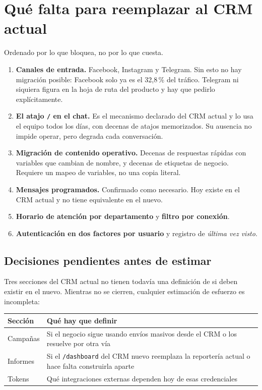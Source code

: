 \documentclass[11pt,a4paper]{article}
\newcommand{\cod}[1]{\texttt{\small #1}}
\begin{document}
\section{Qué falta para reemplazar al CRM actual}

Ordenado por lo que bloquea, no por lo que cuesta.

\begin{enumerate}
  \item \textbf{Canales de entrada.} Facebook, Instagram y Telegram. Sin esto no hay
        migración posible: Facebook solo ya es el 32,8\,\% del tráfico. Telegram ni
        siquiera figura en la hoja de ruta del producto y hay que pedirlo
        explícitamente.

  \item \textbf{El atajo \cod{/} en el chat.} Es el mecanismo declarado del CRM actual
        y lo usa el equipo todos los días, con decenas de atajos memorizados. Su
        ausencia no impide operar, pero degrada cada conversación.

  \item \textbf{Migración de contenido operativo.} Decenas de respuestas rápidas con
        variables que cambian de nombre, y decenas de etiquetas de negocio. Requiere un
        mapeo de variables, no una copia literal.

  \item \textbf{Mensajes programados.} Confirmado como necesario. Hoy existe en el CRM
        actual y no tiene equivalente en el nuevo.

  \item \textbf{Horario de atención por departamento} y \textbf{filtro por conexión}.

  \item \textbf{Autenticación en dos factores por usuario} y registro de
        \emph{última vez visto}.
\end{enumerate}

\subsection{Decisiones pendientes antes de estimar}

Tres secciones del CRM actual no tienen todavía una definición de si deben existir en
el nuevo. Mientras no se cierren, cualquier estimación de esfuerzo es incompleta:

\begin{center}
\begin{tabularx}{\textwidth}{@{}lL@{}}
\toprule
\textbf{Sección} & \textbf{Qué hay que definir} \\
\midrule
Campañas & Si el negocio sigue usando envíos masivos desde el CRM o los resuelve por
           otra vía \\
Informes & Si el \cod{/dashboard} del CRM nuevo reemplaza la reportería actual o hace
           falta construirla aparte \\
Tokens   & Qué integraciones externas dependen hoy de esas credenciales \\
\bottomrule
\end{tabularx}
\end{center}
\end{document}
